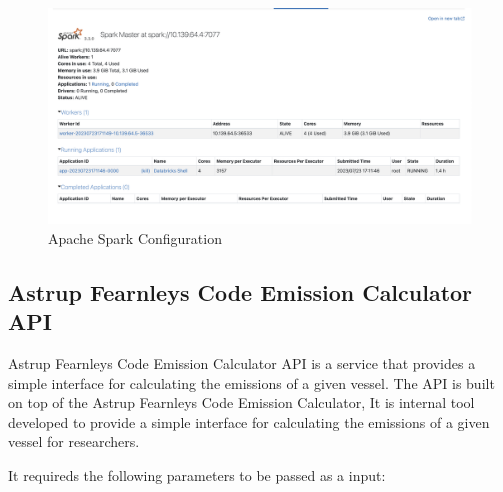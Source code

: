 \begin{figure}[h]
    \centering
    \includegraphics[width=1\textwidth]{images/spark_config.png}
    \caption{Apache Spark Configuration}
    \label{spark_config}
\end{figure}

\subsection{Astrup Fearnleys Code Emission Calculator API}

Astrup Fearnleys Code Emission Calculator API is a service that provides a simple interface for calculating the emissions of a given vessel.
The API is built on top of the Astrup Fearnleys Code Emission Calculator, It is internal tool developed to provide a simple interface for calculating the emissions of a given vessel for researchers.

It requireds the following parameters to be passed as a input:

\newpage

